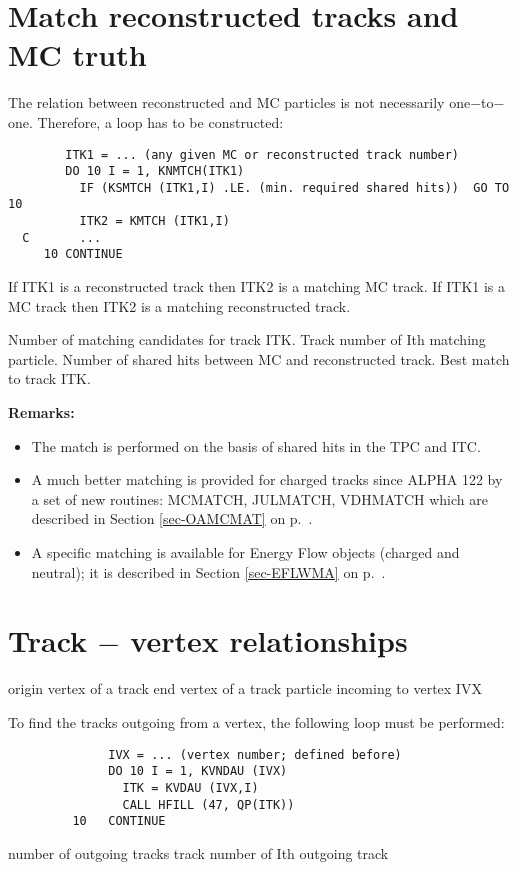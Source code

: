 \section{\label{sec-AX}Match reconstructed tracks and MC truth}
\par
The relation between reconstructed and MC particles is not necessarily
one$-$to$-$one. Therefore, a loop has to be constructed:
\begin{verbatim}
        ITK1 = ... (any given MC or reconstructed track number)
        DO 10 I = 1, KNMTCH(ITK1)
          IF (KSMTCH (ITK1,I) .LE. (min. required shared hits))  GO TO 10
          ITK2 = KMTCH (ITK1,I)
  C       ...
     10 CONTINUE
\end{verbatim}
If ITK1 is a reconstructed track then ITK2 is a matching MC track.
If ITK1 is a MC track then ITK2 is a matching reconstructed track.
\begin{indentlist}{ 3.25cm}{ 3.50cm}
Number of matching candidates for track ITK.
Track number of Ith matching particle.
Number of shared hits between MC and reconstructed
track.
Best  match to track ITK.

\end{indentlist}
\newpage
{\bf Remarks:}
\begin{itemize}
\item The match is performed on the basis of shared hits in the
TPC and ITC.
\item A much better matching is provided for charged tracks
since ALPHA 122 by a set of new 
routines:
 MCMATCH, JULMATCH, VDHMATCH which are described in Section \ref{sec-OAMCMAT}
on p.~\pageref{sec-OAMCMAT}.
\item A specific matching is available for Energy Flow objects (charged and
neutral);  
it is described in Section \ref{sec-EFLWMA} on p.~\pageref{sec-EFLWMA}.

\end{itemize}
\section{\label{sec-AV}Track $-$ vertex relationships}
\par
\begin{indentlist}{ 4.75cm}{ 5.00cm}
origin vertex of a track
end vertex of a track
particle incoming to vertex IVX
 
\end{indentlist}
To find the tracks outgoing from a vertex, the following
loop must be performed:
\begin{verbatim}
              IVX = ... (vertex number; defined before)
              DO 10 I = 1, KVNDAU (IVX)
                ITK = KVDAU (IVX,I)
                CALL HFILL (47, QP(ITK))
         10   CONTINUE
\end{verbatim}
\begin{indentlist}{ 3.25cm}{ 3.50cm}
number of outgoing tracks
track number of Ith outgoing track
\end{indentlist}
